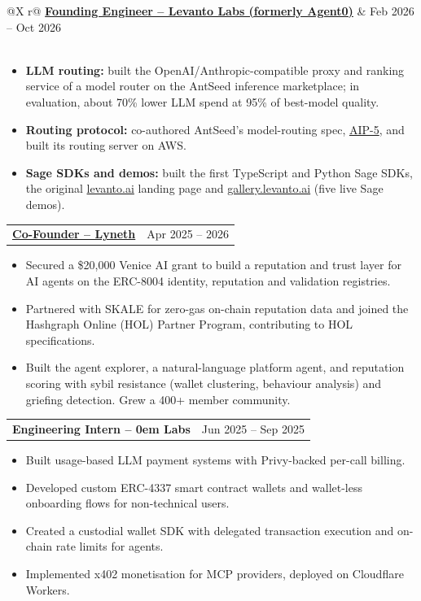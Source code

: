 \documentclass[a4paper,11pt]{article}
\makeatletter
\newenvironment{job}[2]{%
\needspace{4\baselineskip}%
\begin{tabularx}{\linewidth}{ @{}X r@{} }
\textbf{#1} & #2 \\[1pt]
\end{tabularx}
\vspace{-11pt}
\begin{itemize}[nosep, leftmargin=1em, itemsep=1.5pt]
}{%
\end{itemize}
\vspace{4pt}
}
\newenvironment{jobctx}[3]{%
\needspace{5\baselineskip}%
\begin{tabularx}{\linewidth}{ @{}X r@{} }
\textbf{#1} & #2 \\[1pt]
\multicolumn{2}{@{}p{\linewidth}@{}}{\small\itshape\color{black!75} #3} \\
\end{tabularx}
\vspace{-11pt}
\begin{itemize}[nosep, leftmargin=1em, itemsep=1.5pt]
}{%
\end{itemize}
\vspace{4pt}
}
\newcommand{\lead}[1]{\looseness=-1\textbf{#1:}}
\newcommand{\grp}[1]{\vspace{3pt}\item[]\hspace{-1em}{\color{black!70}\textsc{#1}}\par\nobreak\@nobreaktrue}
\newcommand{\ERC}{\mbox{ERC-8004}}
\newcommand{\plainhref}[2]{\href{#1}{#2}}
\makeatother
\begin{document}
\begin{jobctx}{\plainhref{https://levanto.ai}{Founding Engineer -- Levanto Labs (formerly Agent0)}}{Feb 2026 -- Oct 2026}
    \grp{Sage: model routing, SDKs and demos}
    \item[--] \lead{LLM routing} built the OpenAI/Anthropic-compatible proxy and ranking service of a model router on the AntSeed inference marketplace; in evaluation, about 70\% lower LLM spend at 95\% of best-model quality.
    \item[--] \lead{Routing protocol} co-authored AntSeed's model-routing spec, \href{https://github.com/Antseed/AIPs/pull/10}{AIP-5}, and built its routing server on AWS.
    \item[--] \lead{Sage SDKs and demos} built the first TypeScript and Python Sage SDKs, the original \href{https://levanto.ai}{levanto.ai} landing page and \href{https://gallery.levanto.ai}{gallery.levanto.ai} (five live Sage demos).
\end{jobctx}

\begin{job}{\plainhref{https://lyneth.ai}{Co-Founder -- Lyneth}}{Apr 2025 -- 2026}
    \item[--] Secured a \$20,000 Venice AI grant to build a reputation and trust layer for AI agents on the \ERC{} identity, reputation and validation registries.
    \item[--] Partnered with SKALE for zero-gas on-chain reputation data and joined the Hashgraph Online (HOL) Partner Program, contributing to HOL specifications.
    \item[--] Built the agent explorer, a natural-language platform agent, and reputation scoring with sybil resistance (wallet clustering, behaviour analysis) and griefing detection. Grew a 400+ member community.
\end{job}

\begin{job}{Engineering Intern -- 0em Labs}{Jun 2025 -- Sep 2025}
    \item[--] Built usage-based LLM payment systems with Privy-backed per-call billing.
    \item[--] Developed custom ERC-4337 smart contract wallets and wallet-less onboarding flows for non-technical users.
    \item[--] Created a custodial wallet SDK with delegated transaction execution and on-chain rate limits for agents.
    \item[--] Implemented x402 monetisation for MCP providers, deployed on Cloudflare Workers.
\end{job}

\end{document}
